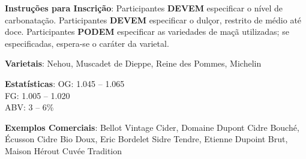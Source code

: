 \textbf{Instruções para Inscrição}: Participantes \textbf{DEVEM} especificar o nível de carbonatação. Participantes \textbf{DEVEM} especificar o dulçor, restrito de médio até doce. Participantes \textbf{PODEM} especificar as variedades de maçã utilizadas; se especificadas, espera-se o caráter da varietal.

\textbf{Varietais}: Nehou, Muscadet de Dieppe, Reine des Pommes, Michelin

\textbf{Estatísticas}: OG: 1.045 – 1.065 \\
\phantom{ } \hspace{16.5mm} FG: 1.005 – 1.020 \\
\phantom{ } \hspace{16.5mm} ABV: 3 – 6\%

\textbf{Exemplos Comerciais}: Bellot Vintage Cider, Domaine Dupont Cidre Bouché, Écusson Cidre Bio Doux, Eric Bordelet Sidre Tendre, Etienne Dupoint Brut, Maison Hérout Cuvée Tradition
